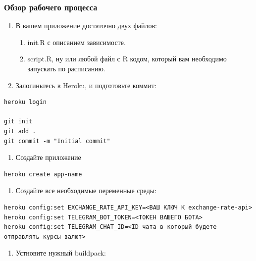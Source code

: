 \documentclass[
]{book}
\providecommand{\tightlist}{%
  \setlength{\itemsep}{0pt}\setlength{\parskip}{0pt}}
\begin{document}
\subsubsection{Обзор рабочего процесса}\label{ux43eux431ux437ux43eux440-ux440ux430ux431ux43eux447ux435ux433ux43e-ux43fux440ux43eux446ux435ux441ux441ux430-3}

\begin{enumerate}
\def\labelenumi{\arabic{enumi}.}
\tightlist
\item
  В вашем приложение достаточно двух файлов:

  \begin{enumerate}
  \def\labelenumii{\arabic{enumii}.}
  \tightlist
  \item
    init.R с описанием зависимосте.
  \item
    script.R, ну или любой файл с R кодом, который вам необходимо запускать по расписанию.
  \end{enumerate}
\item
  Залогиньтесь в Heroku, и подготовьте коммит:
\end{enumerate}

\begin{verbatim}
heroku login

git init
git add .
git commit -m "Initial commit"
\end{verbatim}

\begin{enumerate}
\def\labelenumi{\arabic{enumi}.}
\setcounter{enumi}{2}
\tightlist
\item
  Создайте приложение
\end{enumerate}

\begin{verbatim}
heroku create app-name
\end{verbatim}

\begin{enumerate}
\def\labelenumi{\arabic{enumi}.}
\setcounter{enumi}{3}
\tightlist
\item
  Создайте все необходимые переменные среды:
\end{enumerate}

\begin{verbatim}
heroku config:set EXCHANGE_RATE_API_KEY=<ВАШ КЛЮЧ К exchange-rate-api>
heroku config:set TELEGRAM_BOT_TOKEN=<ТОКЕН ВАШЕГО БОТА>
heroku config:set TELEGRAM_CHAT_ID=<ID чата в который будете отправлять курсы валют>
\end{verbatim}

\begin{enumerate}
\def\labelenumi{\arabic{enumi}.}
\setcounter{enumi}{4}
\tightlist
\item
  Устновите нужный buildpack:
\end{enumerate}
\end{document}
